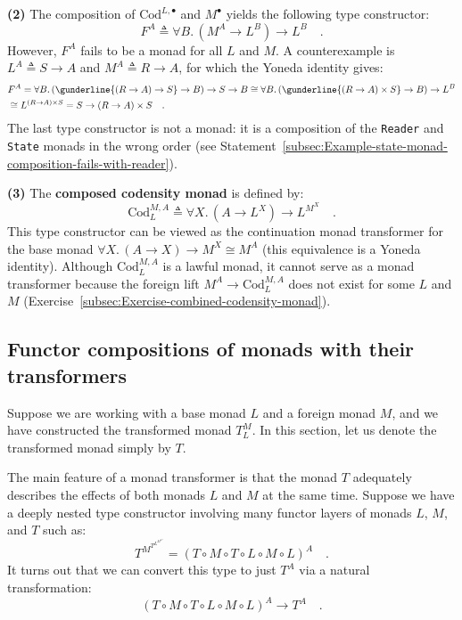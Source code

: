 \textbf{(2)} The composition of $\text{Cod}^{L,\bullet}$ and $M^{\bullet}$
yields the following type constructor:
\[
F^{A}\triangleq\forall B.\,(M^{A}\rightarrow L^{B})\rightarrow L^{B}\quad.
\]
However, $F^{A}$ fails to be a monad for all $L$ and $M$. A counterexample
is $L^{A}\triangleq S\rightarrow A$ and $M^{A}\triangleq R\rightarrow A$,
for which the Yoneda identity gives:
\begin{align*}
 & F^{A}=\forall B.\,(\gunderline{(R\rightarrow A)\rightarrow S}\rightarrow B)\rightarrow S\rightarrow B\cong\forall B.\,(\gunderline{(R\rightarrow A)\times S}\rightarrow B)\rightarrow L^{B}\\
 & \cong L^{(R\rightarrow A)\times S}=S\rightarrow\left(R\rightarrow A\right)\times S\quad.
\end{align*}
The last type constructor is not a monad: it is a composition of the
\lstinline!Reader! and \lstinline!State! monads in the wrong order
(see Statement~\ref{subsec:Example-state-monad-composition-fails-with-reader}).

\textbf{(3)} The \textbf{composed codensity monad}
is defined by:
\[
\text{Cod}_{L}^{M,A}\triangleq\forall X.\,(A\rightarrow L^{X})\rightarrow L^{M^{X}}\quad.
\]
This type constructor can be viewed as the continuation monad transformer
for the base monad $\forall X.\,(A\rightarrow X)\rightarrow M^{X}\cong M^{A}$
(this equivalence is a Yoneda identity). Although $\text{Cod}_{L}^{M,A}$
is a lawful monad, it cannot serve as a monad transformer because
the foreign lift $M^{A}\rightarrow\text{Cod}_{L}^{M,A}$ does not
exist for some $L$ and $M$ (Exercise~\ref{subsec:Exercise-combined-codensity-monad}).

\subsection{Functor compositions of monads with their transformers}

Suppose we are working with a base monad $L$ and a foreign monad
$M$, and we have constructed the transformed monad $T_{L}^{M}$.
In this section, let us denote the transformed monad simply by $T$. 

The main feature of a monad transformer is that the monad $T$ adequately
describes the effects of both monads $L$ and $M$ at the same time.
Suppose we have a deeply nested type constructor involving many functor
layers of monads $L$, $M$, and $T$ such as:
\[
T^{M^{T^{L^{M^{L^{A}}}}}}=\left(T\circ M\circ T\circ L\circ M\circ L\right)^{A}\quad.
\]
It turns out that we can convert this type to just $T^{A}$ via a
natural transformation:
\[
\left(T\circ M\circ T\circ L\circ M\circ L\right)^{A}\rightarrow T^{A}\quad.
\]

